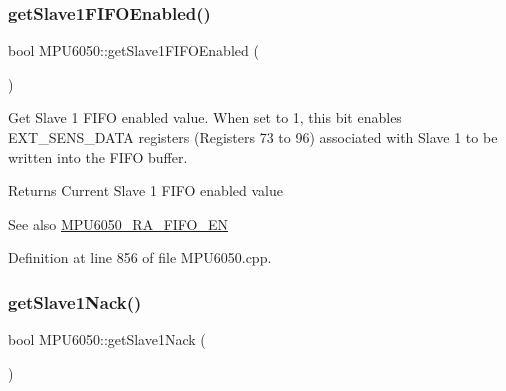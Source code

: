 \subsubsection{\texorpdfstring{getSlave1FIFOEnabled()}{getSlave1FIFOEnabled()}}
{\footnotesize\ttfamily bool M\+P\+U6050\+::get\+Slave1\+F\+I\+F\+O\+Enabled (\begin{DoxyParamCaption}{ }\end{DoxyParamCaption})}

Get Slave 1 F\+I\+FO enabled value. When set to 1, this bit enables E\+X\+T\+\_\+\+S\+E\+N\+S\+\_\+\+D\+A\+TA registers (Registers 73 to 96) associated with Slave 1 to be written into the F\+I\+FO buffer. \begin{DoxyReturn}{Returns}
Current Slave 1 F\+I\+FO enabled value 
\end{DoxyReturn}
\begin{DoxySeeAlso}{See also}
\mbox{\hyperlink{MPU6050_8h_a1166fe50f4792f3266e15dc3273e375d}{M\+P\+U6050\+\_\+\+R\+A\+\_\+\+F\+I\+F\+O\+\_\+\+EN}} 
\end{DoxySeeAlso}


Definition at line 856 of file M\+P\+U6050.\+cpp.


\begin{DoxyCode}{0}

\end{DoxyCode}
\mbox{\label{classMPU6050_a65cc9d75ff347b146414685fb83fa451}} 
\subsubsection{\texorpdfstring{getSlave1Nack()}{getSlave1Nack()}}
{\footnotesize\ttfamily bool M\+P\+U6050\+::get\+Slave1\+Nack (\begin{DoxyParamCaption}{ }\end{DoxyParamCaption})}

